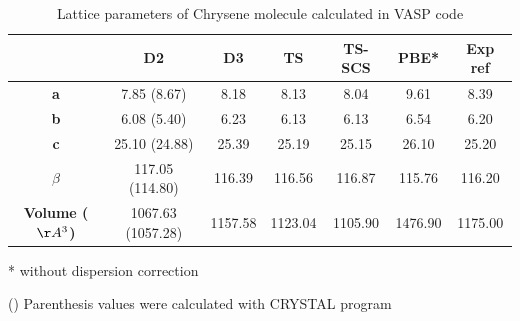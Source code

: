  		
 		\begin{table}[H]
 			\caption{Lattice parameters of Chrysene molecule calculated in VASP code} \label{table-chrysol}
 			\begin{center}
 				\begin{threeparttable}
 				\begin{tabular}{c c c c c c c}
 					\toprule
 					& \textbf{D2} & \textbf{D3} & \textbf{TS} & \textbf{TS-SCS} & \textbf{PBE*} & \textbf{Exp} ref\cite{burns1960refinement} \\
 					\midrule
 					\textbf{a} & 7.85 (8.67) & 8.18 & 8.13 & 8.04 & 9.61 & 8.39\\
 					\textbf{b}& 6.08 (5.40) & 6.23 & 6.13 & 6.13 & 6.54 & 6.20\\
 					\textbf{c}& 25.10 (24.88) & 25.39 & 25.19 & 25.15 & 26.10 & 25.20\\
 					\textbf{$\beta$} & 117.05 (114.80) & 116.39 & 116.56 & 116.87& 115.76 & 116.20\\
 					\textbf{Volume ($\AA^{3}$)}& 1067.63 (1057.28)& 1157.58 & 1123.04 & 1105.90 & 1476.90 & 1175.00\\
 					\bottomrule
 				\end{tabular}
 				
 					\begin{tablenotes}
 						\item[*] without dispersion correction
 						\item[()] Parenthesis values were calculated with CRYSTAL program
 					\end{tablenotes}
 				\end{threeparttable}
 			\end{center}
 		\end{table}
 		

